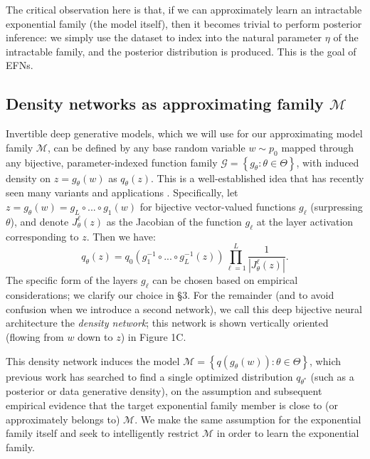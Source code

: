 \documentclass{article}
\begin{document}
The critical observation here is that, if we can approximately learn an intractable exponential family (the model itself), then it becomes trivial to perform posterior inference: we simply use the dataset to index into the natural parameter $\eta$ of the intractable family, and the posterior distribution is produced.  This is the goal of EFNs.

\subsection{Density networks as approximating family $\mathcal{M}$}

Invertible deep generative models, which we will use for our approximating model family $\mathcal{M}$, can be defined by any base random variable $w\sim p_0$ mapped through any bijective, parameter-indexed function family  $\mathcal{G} = \left\{g_\theta: \theta \in \Theta\right\}$, with induced density on $z=g_\theta(w)$ as $q_\theta(z)$.  This is a well-established idea that has recently seen many variants and applications \citep{mackay1997density, baird2005one, tabak2010density, rippel2013high, uria2013rnade, rezende2015variational, dinh2016density, papamakarios2017masked, jacobsen2018revnet}.  Specifically, let $z = g_\theta(w) = g_L \circ ... \circ g_1(w)$ for bijective vector-valued functions $g_\ell$ (surpressing $\theta$), and denote $J^\ell_\theta(z)$ as the Jacobian of the function $g_\ell$ at the layer activation corresponding to $z$.  Then we have:
{\small 
\begin{equation}
q_\theta(z) = q_0\left( g_1^{-1} \circ ... \circ g_L^{-1}(z) \right) \prod_{\ell=1}^L \frac{1}{| J^\ell_\theta(z) |}.
\label{eq:4}
\end{equation}}
The specific form of the layers $g_\ell$ can be chosen based on empirical considerations; we clarify our choice in \S3.  For the remainder (and to avoid confusion when we introduce a second network), we call this deep bijective neural architecture the \emph{density network}; this network is shown vertically oriented (flowing from $w$ down to $z$) in Figure 1C.

This density network induces the model $\mathcal{M} = \left\{ q(g_\theta(w)) : \theta \in \Theta \right\}$, which previous work has searched to find a single optimized distribution $q_{\theta^*}$ (such as a posterior or data generative density), on the assumption and subsequent empirical evidence that the target exponential family member is close to (or approximately belongs to) $\mathcal{M}$.   We make the same assumption for the exponential family itself and seek to intelligently restrict $\mathcal{M}$ in order to learn the exponential family.  
\end{document}
